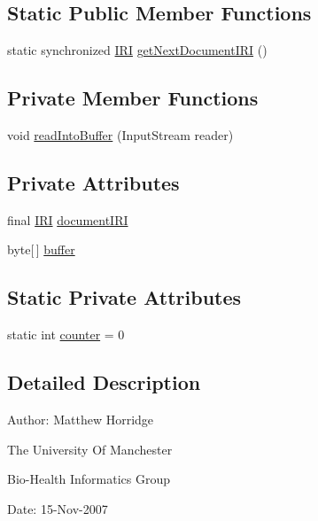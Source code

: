 \subsection*{Static Public Member Functions}
\begin{DoxyCompactItemize}
\item 
static synchronized \hyperlink{classorg_1_1semanticweb_1_1owlapi_1_1model_1_1_i_r_i}{I\-R\-I} \hyperlink{classorg_1_1semanticweb_1_1owlapi_1_1io_1_1_stream_document_source_a72b34830cf6a385dee9eefac02e33a3c}{get\-Next\-Document\-I\-R\-I} ()
\end{DoxyCompactItemize}
\subsection*{Private Member Functions}
\begin{DoxyCompactItemize}
\item 
void \hyperlink{classorg_1_1semanticweb_1_1owlapi_1_1io_1_1_stream_document_source_a10190f7f37cf77eed7bcc9388ca7a023}{read\-Into\-Buffer} (Input\-Stream reader)
\end{DoxyCompactItemize}
\subsection*{Private Attributes}
\begin{DoxyCompactItemize}
\item 
final \hyperlink{classorg_1_1semanticweb_1_1owlapi_1_1model_1_1_i_r_i}{I\-R\-I} \hyperlink{classorg_1_1semanticweb_1_1owlapi_1_1io_1_1_stream_document_source_a86e12cbfa2b87e56537fe5b28d100eb0}{document\-I\-R\-I}
\item 
byte\mbox{[}$\,$\mbox{]} \hyperlink{classorg_1_1semanticweb_1_1owlapi_1_1io_1_1_stream_document_source_aa03542598b0a230911b3e8e739746c4a}{buffer}
\end{DoxyCompactItemize}
\subsection*{Static Private Attributes}
\begin{DoxyCompactItemize}
\item 
static int \hyperlink{classorg_1_1semanticweb_1_1owlapi_1_1io_1_1_stream_document_source_aea84bd7041ae30d6a90689cace5333a4}{counter} = 0
\end{DoxyCompactItemize}


\subsection{Detailed Description}
Author\-: Matthew Horridge\par
 The University Of Manchester\par
 Bio-\/\-Health Informatics Group\par
 Date\-: 15-\/\-Nov-\/2007\par
\par


